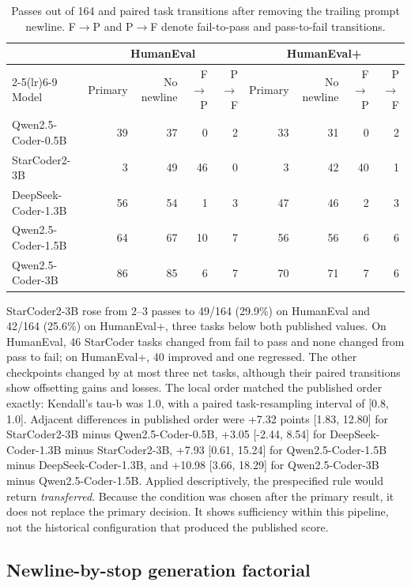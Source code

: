 \documentclass[10pt,twocolumn]{article}
\begin{document}
\begin{table}[t]
\centering
\caption{Passes out of 164 and paired task transitions after removing the trailing prompt newline. F$\rightarrow$P and P$\rightarrow$F denote fail-to-pass and pass-to-fail transitions.}
\label{tab:newline}
\scriptsize
\begin{tabularx}{\textwidth}{@{}Xrrrrrrrr@{}}
\toprule
 & \multicolumn{4}{c}{HumanEval} & \multicolumn{4}{c}{HumanEval+} \\
\cmidrule(lr){2-5}\cmidrule(lr){6-9}
Model & Primary & No newline & F$\rightarrow$P & P$\rightarrow$F & Primary & No newline & F$\rightarrow$P & P$\rightarrow$F \\
\midrule
Qwen2.5-Coder-0.5B & 39 & 37 & 0 & 2 & 33 & 31 & 0 & 2 \\
StarCoder2-3B & 3 & 49 & 46 & 0 & 3 & 42 & 40 & 1 \\
DeepSeek-Coder-1.3B & 56 & 54 & 1 & 3 & 47 & 46 & 2 & 3 \\
Qwen2.5-Coder-1.5B & 64 & 67 & 10 & 7 & 56 & 56 & 6 & 6 \\
Qwen2.5-Coder-3B & 86 & 85 & 6 & 7 & 70 & 71 & 7 & 6 \\
\bottomrule
\end{tabularx}
\end{table}

StarCoder2-3B rose from 2--3 passes to 49/164 (29.9\%) on HumanEval and 42/164 (25.6\%) on HumanEval+, three tasks below both published values. On HumanEval, 46 StarCoder tasks changed from fail to pass and none changed from pass to fail; on HumanEval+, 40 improved and one regressed. The other checkpoints changed by at most three net tasks, although their paired transitions show offsetting gains and losses. The local order matched the published order exactly: Kendall's tau-b was 1.0, with a paired task-resampling interval of [0.8, 1.0]. Adjacent differences in published order were +7.32 points [1.83, 12.80] for StarCoder2-3B minus Qwen2.5-Coder-0.5B, +3.05 [-2.44, 8.54] for DeepSeek-Coder-1.3B minus StarCoder2-3B, +7.93 [0.61, 15.24] for Qwen2.5-Coder-1.5B minus DeepSeek-Coder-1.3B, and +10.98 [3.66, 18.29] for Qwen2.5-Coder-3B minus Qwen2.5-Coder-1.5B. Applied descriptively, the prespecified rule would return \emph{transferred}. Because the condition was chosen after the primary result, it does not replace the primary decision. It shows sufficiency within this pipeline, not the historical configuration that produced the published score.

\subsection{Newline-by-stop generation factorial}
\end{document}
